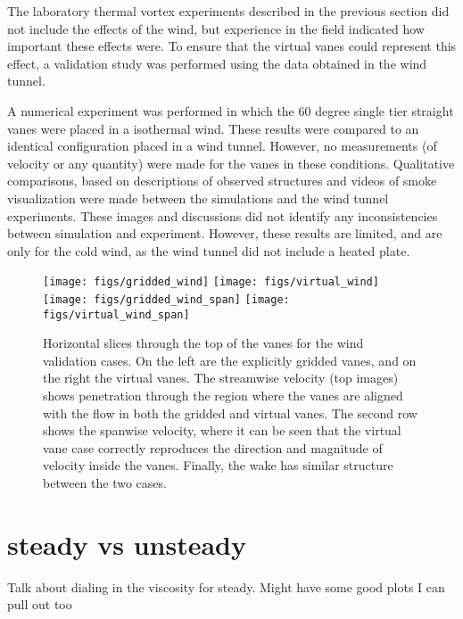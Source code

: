 The laboratory thermal vortex experiments described in the previous
section did not include the effects of the wind, but experience in
the field indicated how important these effects were. To ensure that the
virtual vanes could represent this effect, a validation study 
was performed using the data obtained in the wind tunnel.

A numerical experiment was performed in which the 60 degree single tier
straight vanes were placed in a isothermal wind.  These results were
compared to an identical configuration placed in a wind tunnel.
However, no measurements (of velocity or any quantity) were made
for the vanes in these conditions. Qualitative comparisons, based on
descriptions of observed structures and videos of smoke visualization
were made between the simulations and the wind tunnel experiments. These
images and discussions did not 
identify any inconsistencies between simulation and experiment.
However, these results are limited, and are only for the cold wind, as
the wind tunnel did not include a heated plate. 

\begin{figure}
  \centering
  \texttt{[image: figs/gridded\_wind]}
  \hfill
  \texttt{[image: figs/virtual\_wind]}
  \\
  \texttt{[image: figs/gridded\_wind\_span]}
  \hfill
  \texttt{[image: figs/virtual\_wind\_span]}
  \label{fig:wind_val}
 \caption{Horizontal slices through the top of the vanes for the
 wind validation cases. On the left are the explicitly gridded vanes,
 and on the right the virtual vanes. The streamwise velocity (top
 images) shows penetration through the region where the vanes are aligned
 with the flow in both the gridded and virtual vanes. The second row
 shows the spanwise velocity, where it can be seen that the virtual vane
 case correctly reproduces the direction and magnitude of velocity
 inside the vanes. Finally, the wake has similar structure between the
 two cases.} 

\end{figure}


\section{steady vs unsteady}
Talk about dialing in the viscosity for steady. Might have some good
plots I can pull out too

